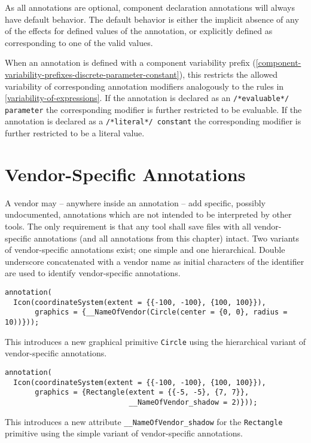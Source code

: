 As all annotations are optional, component declaration annotations will always have default behavior.
The default behavior is either the implicit absence of any of the effects for defined values of the annotation, or explicitly defined as corresponding to one of the valid values.

When an annotation is defined with a component variability prefix (\cref{component-variability-prefixes-discrete-parameter-constant}), this restricts the allowed variability of corresponding annotation modifiers analogously to the rules in \cref{variability-of-expressions}.
If the annotation is declared as an \lstinline!/*evaluable*/ parameter! the corresponding modifier is further restricted to be evaluable.
If the annotation is declared as a \lstinline!/*literal*/ constant! the corresponding modifier is further restricted to be a literal value.

\section{Vendor-Specific Annotations}\label{vendor-specific-annotations}

A vendor may -- anywhere inside an annotation -- add specific, possibly undocumented, annotations which are not intended to be interpreted by other tools.
The only requirement is that any tool shall save files with all vendor-specific annotations (and all annotations from this chapter) intact.
Two variants of vendor-specific annotations exist; one simple and one hierarchical.
Double underscore concatenated with a vendor name as initial characters of the identifier are used to identify vendor-specific annotations.

\begin{example}
\begin{lstlisting}[language=modelica]
annotation(
  Icon(coordinateSystem(extent = {{-100, -100}, {100, 100}}),
       graphics = {__NameOfVendor(Circle(center = {0, 0}, radius = 10))}));
\end{lstlisting}
This introduces a new graphical primitive \lstinline!Circle! using the hierarchical variant of vendor-specific annotations.
\begin{lstlisting}[language=modelica]
annotation(
  Icon(coordinateSystem(extent = {{-100, -100}, {100, 100}}),
       graphics = {Rectangle(extent = {{-5, -5}, {7, 7}},
                             __NameOfVendor_shadow = 2)}));
\end{lstlisting}
This introduces a new attribute \lstinline!__NameOfVendor_shadow! for the \lstinline!Rectangle! primitive using the simple variant of vendor-specific annotations.
\end{example}

